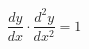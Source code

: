 \documentclass{jarticle}
\begin{document}
\[
\frac{dy}{dx} \cdot \frac{d^2 y}{d x^2} = 1
\]
\end{document}
